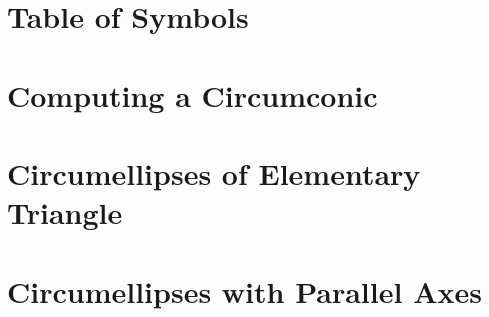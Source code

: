 %

\section{Table of Symbols}
\label{app:symbols}


\section{Computing a  Circumconic}
\label{app:circum-linear}


\section{Circumellipses of Elementary Triangle}
\label{app:circum-x1x2x9}


\section{Circumellipses with Parallel Axes}
\label{app:ce_parallel}


